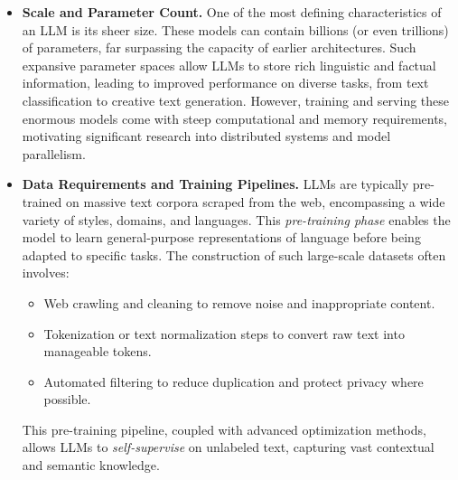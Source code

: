 \begin{itemize}
    \item \textbf{Scale and Parameter Count.}
    One of the most defining characteristics of an LLM is its sheer size. These models can contain billions (or even trillions) of parameters, far surpassing the capacity of earlier architectures. Such expansive parameter spaces allow LLMs to store rich linguistic and factual information, leading to improved performance on diverse tasks, from text classification to creative text generation. However, training and serving these enormous models come with steep computational and memory requirements, motivating significant research into distributed systems and model parallelism.

    \item \textbf{Data Requirements and Training Pipelines.}
    LLMs are typically pre-trained on massive text corpora scraped from the web, encompassing a wide variety of styles, domains, and languages. This \emph{pre-training phase} enables the model to learn general-purpose representations of language before being adapted to specific tasks. The construction of such large-scale datasets often involves:
    \begin{itemize}
        \item Web crawling and cleaning to remove noise and inappropriate content.
        \item Tokenization or text normalization steps to convert raw text into manageable tokens.
        \item Automated filtering to reduce duplication and protect privacy where possible.
    \end{itemize}
    This pre-training pipeline, coupled with advanced optimization methods, allows LLMs to \emph{self-supervise} on unlabeled text, capturing vast contextual and semantic knowledge.


\end{itemize}
